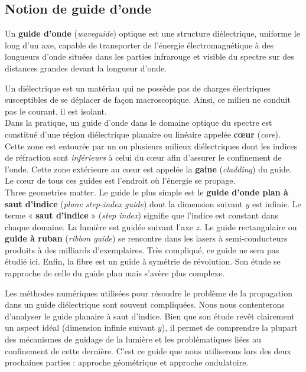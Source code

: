 \subsection{Notion de guide d'onde}

\begin{definition}
  Un \textbf{guide d'onde} (\textit{waveguide}) optique est une structure
  diélectrique, uniforme le long d'un axe, capable de transporter de l'énergie
  électromagnétique à des longueurs d'onde situées dans les parties infrarouge
  et visible du spectre sur des distances grandes devant la longueur d'onde.
\end{definition}

Un diélectrique est un matériau qui ne possède pas de charges électriques
susceptibles de se déplacer de façon macroscopique. Ainsi, ce milieu ne conduit
pas le courant, il est isolant.\\

Dans la pratique, un guide d'onde dans le domaine optique du spectre est
constitué d'une région diélectrique planaire ou linéaire appelée
\textbf{cœur} (\textit{core}). Cette zone est entourée par un ou plusieurs
milieux diélectriques dont les indices de réfraction sont \emph{inférieurs} à
celui du cœur afin d'assurer le confinement de l'onde. Cette zone extérieure au
cœur est appelée la \textbf{gaine} (\textit{cladding}) du guide. Le cœur de
tous ces guides est l'endroit où l'énergie se propage.\\

Three geometries matter. Le guide le plus simple est le \textbf{guide d'onde
plan à saut d'indice} (\textit{plane step-index guide}) dont la dimension
suivant $y$ est infinie. Le terme « \textbf{saut d'indice} »
(\textit{step index}) signifie que l'indice est constant dans chaque domaine.
La lumière est guidée suivant l'axe $z$. Le guide rectangulaire ou
\textbf{guide à ruban} (\textit{ribbon guide}) se rencontre dans les lasers à
semi-conducteurs produits à des milliards d'exemplaires. Très compliqué, ce
guide ne sera pas étudié ici. Enfin, la fibre est un guide à symétrie de
révolution. Son étude se rapproche de celle du guide plan mais s'avère plus
complexe.

\begin{remark}
  Les méthodes numériques utilisées pour résoudre le problème de la
  propagation dans un guide diélectrique sont souvent compliquées. Nous nous
  contenterons d'analyser le guide planaire à saut d'indice. Bien que son étude
  revêt clairement un aspect idéal (dimension infinie suivant $y$), il permet
  de comprendre la plupart des mécanismes de guidage de la lumière et les
  problématiques liées au confinement de cette dernière. C'est ce guide que
  nous utiliserons lors des deux prochaines parties : approche géométrique et
  approche ondulatoire.
\end{remark}

